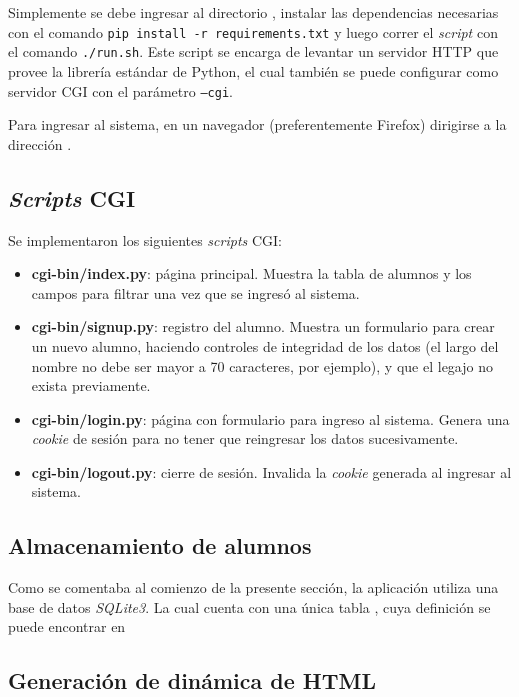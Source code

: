 Simplemente se debe ingresar al directorio , instalar las dependencias necesarias con el comando \texttt{pip install -r requirements.txt} y luego correr el \emph{script}  con el comando \texttt{./run.sh}. Este script se encarga de levantar un servidor HTTP que provee la librería estándar de Python, el cual también se puede configurar como servidor CGI con el parámetro \texttt{--cgi}.

Para ingresar al sistema, en un navegador (preferentemente Firefox) dirigirse a la dirección .

\subsection{\emph{Scripts} CGI}

Se implementaron los siguientes \emph{scripts} CGI:

\begin{itemize}
    \item \textbf{cgi-bin/index.py}: página principal. Muestra la tabla de alumnos y los campos para filtrar una vez que se ingresó al sistema.
    \item \textbf{cgi-bin/signup.py}: registro del alumno. Muestra un formulario para crear un nuevo alumno, haciendo controles de integridad de los datos (el largo del nombre no debe ser mayor a 70 caracteres, por ejemplo), y que el legajo no exista previamente.
    \item \textbf{cgi-bin/login.py}: página con formulario para ingreso al sistema. Genera una \emph{cookie} de sesión para no tener que reingresar los datos sucesivamente. 
    \item \textbf{cgi-bin/logout.py}: cierre de sesión. Invalida la \emph{cookie} generada al ingresar al sistema.
\end{itemize}

\subsection{Almacenamiento de alumnos}

Como se comentaba al comienzo de la presente sección, la aplicación utiliza una base de datos \emph{SQLite3}. La cual cuenta con una única tabla , cuya definición se puede encontrar en 

\subsection{Generación de dinámica de HTML}

